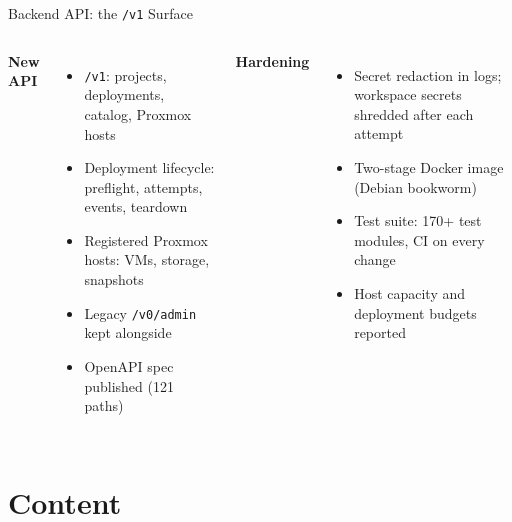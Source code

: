 \documentclass[aspectratio=169]{beamer}
\begin{document}
\begin{frame}{Backend API: the \texttt{/v1} Surface \; \faCogs}
  \begin{columns}[T]
    \textbf{New API}
    \begin{itemize}
      \item \texttt{/v1}: projects, deployments, catalog, Proxmox hosts
      \item Deployment lifecycle: preflight, attempts, events, teardown
      \item Registered Proxmox hosts: VMs, storage, snapshots
      \item Legacy \texttt{/v0/admin} kept alongside
      \item OpenAPI spec published (121 paths)
    \end{itemize}

    \textbf{Hardening}
    \begin{itemize}
      \item \alert{Secret redaction} in logs; workspace secrets shredded after each attempt
      \item \alert{Two-stage Docker image} (Debian bookworm)
      \item \alert{Test suite}: 170+ test modules, CI on every change
      \item Host capacity and deployment budgets reported
    \end{itemize}
  \end{columns}
\end{frame}

\section{Content}
\end{document}
